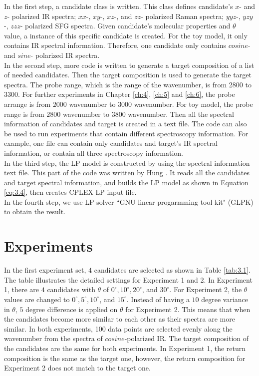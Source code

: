 In the first step, a candidate class is written. This class defines candidate's $x$- and $z$- polarized IR spectra; $xx$-, $xy$-, $xz$-, and $zz$- polarized Raman spectra; $yyz$-, $yzy$-, $zzz$- polarized SFG spectra. Given candidate's molecular properties and $\theta$ value, a instance of this specific candidate is created. For the toy model, it only contains IR spectral information. Therefore, one candidate only contains $cosine$- and $sine$- polarized IR spectra. \\

In the second step, more code is written to generate a target composition of a list of needed candidates. Then the target composition is used to generate the target spectra. The probe range, which is the range of the wavenumber, is from 2800 to 3300. For further experiments in Chapter \ref{ch:4}, \ref{ch:5} and \ref{ch:6}, the probe arrange is from $2000$ wavenumber to $3000$ wavenumber. For toy model, the probe range is from $2800$ wavenumber to $3800$ wavenumber. Then all the spectral information of candidates and target is created in a text file. The code can also be used to run experiments that contain different spectroscopy information. For example, one file can contain only candidates and target's IR spectral information, or contain all three spectroscopy information. \\

In the third step, the LP model is constructed by using the spectral information text file. This part of the code was written by Hung \cite{KuoKaiHung:Thesis:2015}. It reads all the candidates and target spectral information, and builds the LP model as shown in Equation \ref{eq:3.4}, then creates CPLEX LP input file. \\

In the fourth step, we use LP solver ``GNU linear progarmming tool kit" (GLPK) to obtain the result. \\
\section{Experiments}
In the first experiment set, $4$ candidates are selected as shown in Table \ref{tab:3.1}. The table illustrates the detailed settings for Experiment 1 and 2. In Experiment 1, there are $4$ candidates with $\theta$ of $0^{\circ}, 10^{\circ}, 20^{\circ}$, and $30^{\circ}$. For Experiment 2, the $\theta$ values are changed to $0^{\circ}, 5^{\circ}, 10^{\circ}$, and $15^{\circ}$. Instead of having a $10$ degree variance in $\theta$, $5$ degree difference is applied on $\theta$ for Experiment 2. This means that when the candidates become more similar to each other as their spectra are more similar. In both experiments, 100 data points are selected evenly along the wavenumber from the spectra of $cosine$-polarized IR. The target composition of the candidates are the same for both experiments. In Experiment 1, the return composition is the same as the target one, however, the return composition for Experiment 2 does not match to the target one. %

